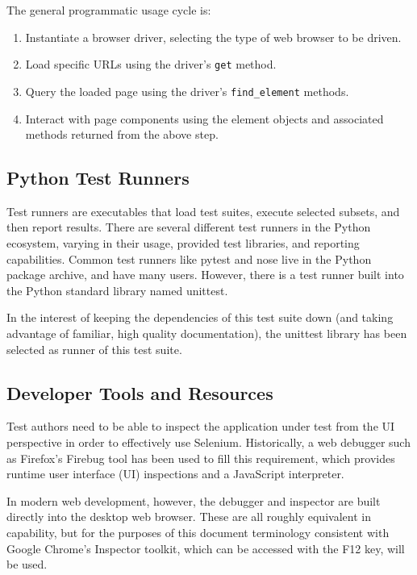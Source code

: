 The general programmatic usage cycle is:
\begin{enumerate}
\item Instantiate a browser driver, selecting the type of web browser to be driven.
\item Load specific URLs using the driver's \texttt{get} method.
\item Query the loaded page using the driver's \texttt{find\_element} methods.
\item Interact with page components using the element objects and associated methods returned from the above step.
\end{enumerate}\citep{artzi2011framework}

\subsection{Python Test Runners}
Test runners are executables that load test suites, execute selected subsets, and then report results. There are several different test runners in the Python ecosystem, varying in their usage, provided test libraries, and reporting capabilities. \citep{nielsen2014python} Common test runners like pytest and nose live in the Python package archive, and have many users. However, there is a test runner built into the Python standard library named unittest.\citep{pajankar2017python}

In the interest of keeping the dependencies of this test suite down (and taking advantage of familiar, high quality documentation), the unittest library has been selected as runner of this test suite.

\subsection{Developer Tools and Resources}
Test authors need to be able to inspect the application under test from the UI perspective in order to effectively use Selenium. Historically, a web debugger such as Firefox's Firebug tool has been used to fill this requirement, which provides runtime user interface (UI) inspections and a JavaScript interpreter.\citep{nicholus2016understanding}

In modern web development, however, the debugger and inspector are built directly into the desktop web browser.\citep{odell2014browser} These are all roughly equivalent in capability, but for the purposes of this document terminology consistent with Google Chrome's Inspector toolkit, which can be accessed with the F12 key, will be used.

